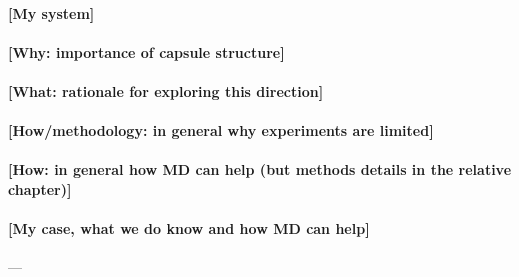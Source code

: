 \documentclass[a4paper,11pt]{extreport}
\begin{document}
\paragraph{[My system]}

\paragraph{[Why: importance of capsule structure]}

\paragraph{[What: rationale for exploring this direction]}

\paragraph{[How/methodology: in general why experiments are limited]}

\paragraph{[How: in general how MD can help (but methods details in the relative chapter)]}

\paragraph{[My case, what we do know and how MD can help]} ---




\end{document}
